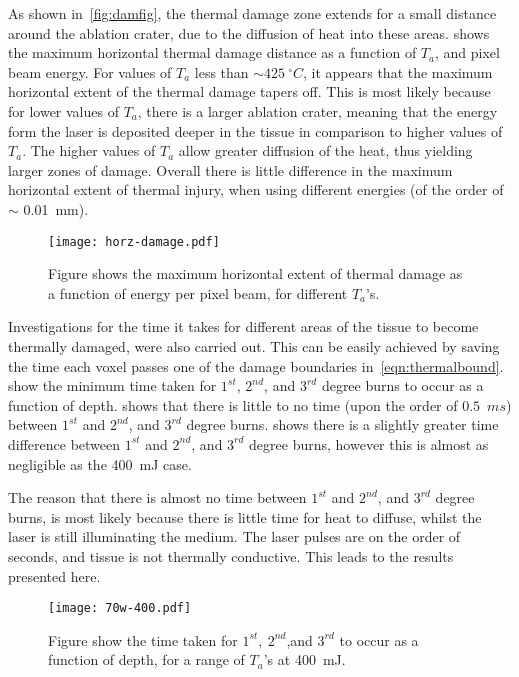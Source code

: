 As shown in~\cref{fig:damfig}, the thermal damage zone extends for a small distance around the ablation crater, due to the diffusion of heat into these areas.  shows the maximum horizontal thermal damage distance as a function of $T_a$, and pixel beam energy. For values of $T_a$ less than $\sim 425~^{\circ}C$, it appears that the maximum horizontal extent of the thermal damage tapers off. This is most likely because for lower values of $T_a$, there is a larger ablation crater, meaning that the energy form the laser is deposited deeper in the tissue in comparison to higher values of $T_a$. The higher values of $T_a$ allow greater diffusion of the heat, thus yielding larger zones of damage. Overall there is little difference in the maximum horizontal extent of thermal injury, when using different energies (of the order of $\sim$ 0.01~mm).

\begin{figure}
	\centering
	\texttt{[image: horz-damage.pdf]}
	\caption{Figure shows the maximum horizontal extent of thermal damage as a function of energy per pixel beam, for different $T_a$'s.}
	\label{fig:horz-70}
\end{figure}

\medskip

Investigations for the time it takes for different areas of the tissue to become thermally damaged, were also carried out. This can be easily achieved by saving the time each voxel passes one of the damage boundaries in~\cref{eqn:thermalbound}.~ show the minimum time taken for $1^{st}$, $2^{nd}$, and $3^{rd}$ degree burns to occur as a function of depth.  shows that there is little to no time (upon the order of $0.5$~$ms$) between $1^{st}$ and $2^{nd}$, and $3^{rd}$ degree burns.
 shows there is a slightly greater time difference between $1^{st}$ and $2^{nd}$, and $3^{rd}$ degree burns, however this is almost as negligible as the 400~mJ case.

The reason that there is almost no time between $1^{st}$ and $2^{nd}$, and $3^{rd}$ degree burns, is most likely because there is little time for heat to diffuse, whilst the laser is still illuminating the medium. The laser pulses are on the order of seconds, and tissue is not thermally conductive. This leads to the results presented here.
	
\begin{figure}[!htb]
	\centering
	\texttt{[image: 70w-400.pdf]}
	\caption{Figure show the time taken for $1^{st},\ 2^{nd}$,and $3^{rd}$ to occur as a function of depth, for a range of $T_a$'s at 400~mJ.}
	\label{fig:time-thres1}
\end{figure}	
	
